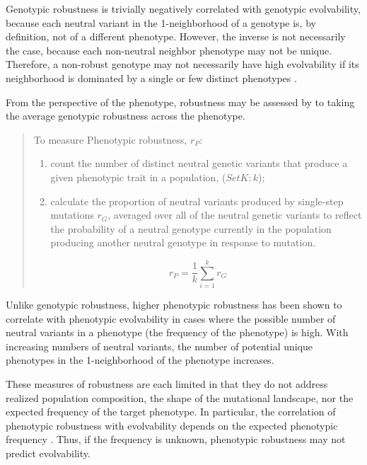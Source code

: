 \documentclass[PhD]{msu-thesis}
\begin{document}
Genotypic robustness is trivially negatively correlated with genotypic evolvability, because each neutral variant in the 1-neighborhood of a genotype is, by definition, not of a different phenotype. However, the inverse is not necessarily the case, because each non-neutral neighbor phenotype may not be unique. Therefore, a non-robust genotype may not necessarily have high evolvability if its neighborhood is dominated by a single or few distinct phenotypes \cite{andreas_wagner_robustness_2008}.

From the perspective of the phenotype, robustness may be assessed by to taking the average genotypic robustness across the phenotype.

\begin{quote}
To measure Phenotypic robustness, $r_P$:

\begin{enumerate}
\item count the number of distinct neutral genetic variants that produce a given phenotypic trait in a population, ($Set K: k$);
\item calculate the proportion of neutral variants produced by single-step mutations $r_G$, averaged over all of the neutral genetic variants to reflect the probability of a neutral genotype currently in the population producing another neutral genotype in response to mutation.
\end{enumerate}
\begin{equation}
r_{P} = \frac{1}{k} \sum_{i=1}^{k} r_{G} 
\end{equation}
\end{quote}

Unlike genotypic robustness, higher phenotypic robustness has been shown to correlate with phenotypic evolvability in cases where the possible number of neutral variants in a phenotype (the frequency of the phenotype) is high\cite{andreas_wagner_robustness_2008}. With increasing numbers of neutral variants, the number of potential unique phenotypes in the 1-neighborhood of the phenotype increases.

These measures of robustness are each limited in that they do not address realized population composition, the shape of the mutational landscape, nor the expected frequency of the target phenotype. In particular, the correlation of phenotypic robustness with evolvability depends on the expected phenotypic frequency \cite{andreas_wagner_robustness_2008}. Thus, if the frequency is unknown, phenotypic robustness may not predict evolvability.
\end{document}
